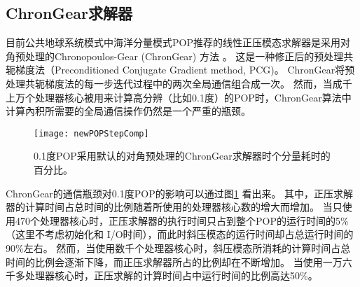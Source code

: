 \subsection{ChronGear求解器}
目前公共地球系统模式中海洋分量模式POP推荐的线性正压模态求解器是采用对角预处理的Chronopoulos-Gear (ChronGear) 方法
\cite{dAzevedo1999lapack}。 这是一种修正后的预处理共轭梯度法（Preconditioned Conjugate
Gradient method, PCG)。 
ChronGear将预处理共轭梯度法的每一步迭代过程中的两次全局通信组合成一次。
然而，当成千上万个处理器核心被用来计算高分辨（比如0.1度）的POP时，ChronGear算法中计算內积所需要的全局通信操作仍然是一个严重的瓶颈。


\begin {figure}[!t]
\centering
\texttt{[image: newPOPStepComp]}
\caption[] {0.1度POP采用默认的对角预处理的ChronGear求解器时个分量耗时的百分比。\label{fig:StepComp}}
\end{figure}


ChronGear的通信瓶颈对0.1度POP的影响可以通过图\ref{fig:StepComp} 看出来。
其中，正压求解器的计算时间占总时间的比例随着所使用的处理器核心数的增大而增加。
当只使用470个处理器核心时，正压求解器的执行时间只占到整个POP的运行时间的5\% （这里不考虑初始化和 I/O时间），而此时斜压模态的运行时间却占总运行时间的90\%左右。
然而，当使用数千个处理器核心时，斜压模态所消耗的计算时间占总时间的比例会逐渐下降，而正压求解器所占的比例却在不断增加。
当使用一万六千多处理器核心时，正压求解的计算时间占中运行时间的比例高达50\%。 

